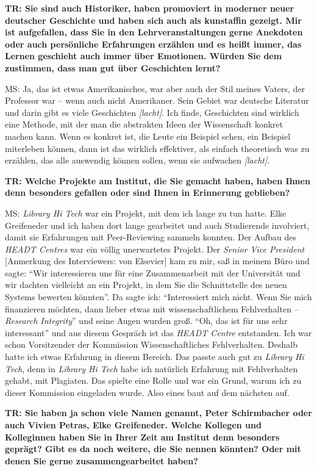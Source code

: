 \documentclass[a4paper,
fontsize=11pt,
oneside,
numbers=noperiodatend,
parskip=half-,
bibliography=totoc,
final
]{scrartcl}
\begin{document}
\textbf{TR: Sie sind auch Historiker, haben promoviert in moderner neuer
deutscher Geschichte und haben sich auch als kunstaffin gezeigt. Mir ist
aufgefallen, dass Sie in den Lehrveranstaltungen gerne Anekdoten oder
auch persönliche Erfahrungen erzählen und es heißt immer, das Lernen
geschieht auch immer über Emotionen. Würden Sie dem zustimmen, dass man
gut über Geschichten lernt?}

MS: Ja, das ist etwas Amerikanisches, war aber auch der Stil meines
Vaters, der Professor war -- wenn auch nicht Amerikaner. Sein Gebiet war
deutsche Literatur und darin gibt es viele Geschichten
\emph{{[}lacht{]}}. Ich finde, Geschichten sind wirklich eine Methode,
mit der man die abstrakten Ideen der Wissenschaft konkret machen kann.
Wenn es konkret ist, die Leute ein Beispiel sehen, ein Beispiel
miterleben können, dann ist das wirklich effektiver, als einfach
theoretisch was zu erzählen, das alle auswendig können sollen, wenn sie
aufwachen \emph{{[}lacht{]}.}

\textbf{TR: Welche Projekte am Institut, die Sie gemacht haben, haben
Ihnen denn besonders gefallen oder sind Ihnen in Erinnerung geblieben?}

MS: \emph{Library Hi Tech} war ein Projekt, mit dem ich lange zu tun
hatte. Elke Greifeneder und ich haben dort lange gearbeitet und auch
Studierende involviert, damit sie Erfahrungen mit Peer-Reviewing sammeln
konnten. Der Aufbau des \emph{HEADT Centres} war ein völlig unerwartetes
Projekt. Der \emph{Senior Vice President} {[}Anmerkung des Interviewers:
von Elsevier{]} kam zu mir, saß in meinem Büro und sagte: \enquote{Wir
interessieren uns für eine Zusammenarbeit mit der Universität und wir
dachten vielleicht an ein Projekt, in dem Sie die Schnittstelle des
neuen Systems bewerten könnten}. Da sagte ich: \enquote{Interessiert
mich nicht. Wenn Sie mich finanzieren möchten, dann lieber etwas mit
wissenschaftlichem Fehlverhalten -- \emph{Research Integrity}} und seine
Augen wurden groß. \enquote{Oh, das ist für uns sehr interessant} und
aus diesem Gespräch ist das \emph{HEADT Centre} entstanden. Ich war
schon Vorsitzender der Kommission Wissenschaftliches Fehlverhalten.
Deshalb hatte ich etwas Erfahrung in diesem Bereich. Das passte auch gut
zu \emph{Library Hi Tech}, denn in \emph{Library Hi Tech} habe ich
natürlich Erfahrung mit Fehlverhalten gehabt, mit Plagiaten. Das spielte
eine Rolle und war ein Grund, warum ich zu dieser Kommission eingeladen
wurde. Also eines baut auf dem nächsten auf.

\textbf{TR: Sie haben ja schon viele Namen genannt, Peter Schirmbacher
oder auch Vivien Petras, Elke Greifeneder. Welche Kollegen und
Kolleginnen haben Sie in Ihrer Zeit am Institut denn besonders geprägt?
Gibt es da noch weitere, die Sie nennen könnten? Oder mit denen Sie
gerne zusammengearbeitet haben?}
\end{document}
